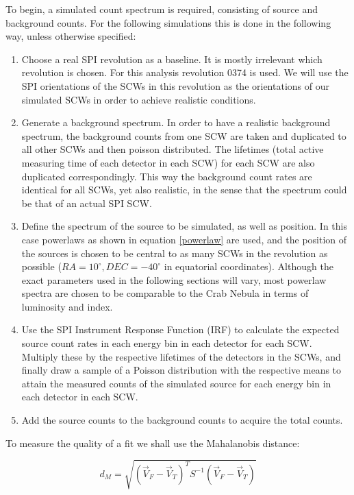 \documentclass{report}
\begin{document}
To begin, a simulated count spectrum is required, consisting of source and background counts. For the following simulations this is done in the following way, unless otherwise specified:

\begin{enumerate} 
  \item Choose a real SPI revolution as a baseline. It is mostly irrelevant which revolution is chosen. For this analysis revolution 0374 is used. We will use the SPI orientations of the SCWs in this revolution as the orientations of our simulated SCWs in order to achieve realistic conditions. 
  \item \label{step pure sim back}Generate a background spectrum. In order to have a realistic background spectrum, the background counts from one SCW are taken and duplicated to all other SCWs and then poisson distributed. The lifetimes (total active measuring time of each detector in each SCW) for each SCW are also duplicated correspondingly. This way the background count rates are identical for all SCWs, yet also realistic, in the sense that the spectrum could be that of an actual SPI SCW.
  \item Define the spectrum of the source to be simulated, as well as position. In this case powerlaws as shown in equation \ref{powerlaw} are used, and the position of the sources is chosen to be central to as many SCWs in the revolution as possible ($RA=10^\circ, DEC=-40^\circ$ in equatorial coordinates). Although the exact parameters used in the following sections will vary, most powerlaw spectra are chosen to be comparable to the Crab Nebula in terms of luminosity and index.
  \item Use the SPI Instrument Response Function (IRF) to calculate the expected source count rates in each energy bin in each detector for each SCW. Multiply these by the respective lifetimes of the detectors in the SCWs, and finally draw a sample of a Poisson distribution with the respective means to attain the measured counts of the simulated source for each energy bin in each detector in each SCW.
  \item Add the source counts to the background counts to acquire the total counts.
\end{enumerate}

To measure the quality of a fit we shall use the Mahalanobis distance:

\begin{equation}
  d_M = \sqrt{(\vec{V}_F - \vec{V}_T)^TS^{-1}(\vec{V}_F-\vec{V}_T)}
\end{equation}
\end{document}
